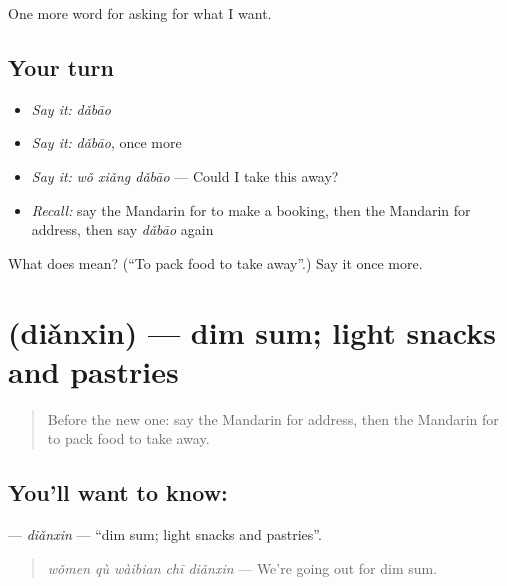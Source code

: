 \begin{grammarlens}[title={What you've built}]
One more word for asking for what I want.
\end{grammarlens}

\subsection*{Your turn}
\begin{itemize}
\raggedright
  \item \emph{Say it:} \emph{dǎbāo}
  \item \emph{Say it:} \emph{dǎbāo}, once more
  \item \emph{Say it:} \emph{wǒ xiǎng dǎbāo} — Could I take this away?
  \item \emph{Recall:} say the Mandarin for to make a booking, then the Mandarin for address, then say \emph{dǎbāo} again
\end{itemize}

\begin{tcolorbox}[breakable,colback=teal!4,colframe=teal!35!black,title={Before you move on}]
What does  mean? (\textquotedblleft{}To pack food to take away\textquotedblright{}.) Say it once more.
\end{tcolorbox}
\section[\texorpdfstring{\zh{点心} (diǎnxin)}{点心 (diǎnxin)}]{ (diǎnxin) — dim sum; light snacks and pastries}

\label{lesson:ZH-C120-dianxin}



\begin{quote}
Before the new one: say the Mandarin for address, then the Mandarin for to pack food to take away.
\end{quote}

\subsection*{You'll want to know: }
\textbf{} — \emph{diǎnxin} — \textquotedblleft{}dim sum; light snacks and pastries\textquotedblright{}.

\begin{quote}
\textbf{} \emph{wǒmen qù wàibian chī diǎnxin} — We're going out for dim sum.
\end{quote}

